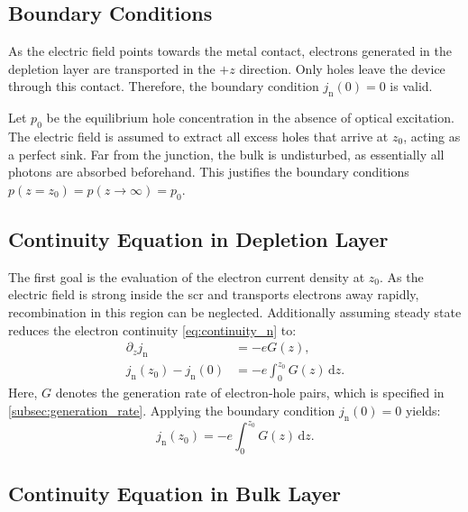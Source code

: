 \subsection{Boundary Conditions}

As the electric field points towards the metal contact, electrons generated in the
depletion layer are transported in the $+z$ direction. Only holes leave the
device through this contact. Therefore, the boundary condition
$j_{\mathrm{n}}(0)= 0$ is valid.

Let $p_{0}$ be the equilibrium hole concentration in the absence of optical
excitation. The electric field is assumed to extract all excess holes that arrive
at $z_{0}$, acting as a perfect sink. Far from the junction, the bulk is
undisturbed, as essentially all photons are absorbed beforehand. This justifies
the boundary conditions $p(z=z_{0})= p(z \to \infty)=p_{0}$.

\subsection{Continuity Equation in Depletion Layer}

The first goal is the evaluation of the electron current density at $z_{0}$. As
the electric field is strong inside the \ac{scr} and transports electrons away rapidly,
recombination in this region can be neglected. Additionally assuming steady state
reduces the electron continuity \cref{eq:continuity_n} to:
\begin{align}
	\partial_{z}j_{\mathrm{n}}              & = -eG(z),                                \\
	j_{\mathrm{n}}(z_{0})-j_{\mathrm{n}}(0) & = -e \int_{0}^{z_{0}}G(z) \,\mathrm{d}z.
\end{align}
Here, $G$ denotes the generation rate of electron-hole pairs, which is specified
in \cref{subsec:generation_rate}. Applying the boundary condition $j_{\mathrm{n}}
(0) =0$ yields:
\begin{equation}
	j_{\mathrm{n}}(z_{0})=-e \int_{0}^{z_{0}}G(z) \, \mathrm{d}z. \label{eq:j_n_scr}
\end{equation}

\subsection{Continuity Equation in Bulk Layer}

